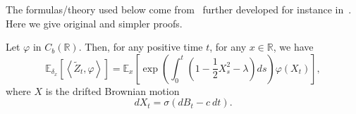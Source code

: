 \documentclass[AHL,Unicode,longabstracts,published]{cedram}
\newcommand*\R{\mathbb{R}}
\newcommand*\E{\mathbb{E}}
\begin{document}
The formulas/theory used below come from~\cite{kurtz1997conceptual,lyons1995conceptual} further developed for instance in~\cite{bansaye_limit_2011,cloez,hardyharris3,Marguet2}. Here we give original and simpler proofs.


\begin{lemm}\label{lem:MTO}
Let $\varphi$ in $C_{b}(\R)$. Then, for any positive time $t$, for any $x\in \R$, we have
\begin{equation}\label{eq:MTO}
\E_{\delta_{x}}\left[\left\langle \widetilde{Z}_{t}, \varphi\right\rangle \right]=\E_{x}\left[\exp\left(\int_{0}^{t} \left(1-\frac{1}{2}X_{s}^{2}-\lambda \right)ds \right)\varphi(X_{t}) \right],
\end{equation}
where $X$ is the drifted Brownian motion
\begin{equation}\label{def:Y}
dX_{t}= \sigma\left(dB_{t}-c\ dt\right).
\end{equation}
\end{lemm}
\end{document}
